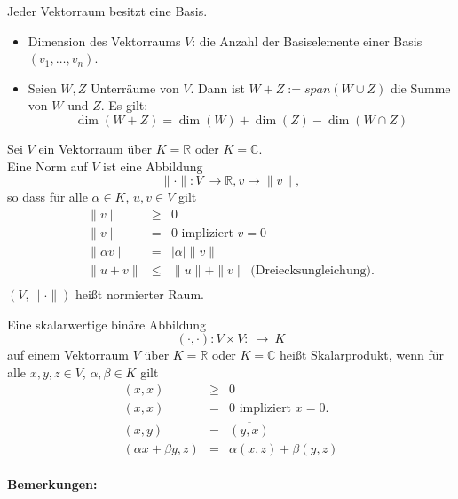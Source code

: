 \documentclass[a4paper,12pt,DIV15]{scrartcl}
\begin{document}
\begin{defn} Jeder Vektorraum besitzt eine Basis.
\begin{itemize}
\item {\color{red} Dimension} des Vektorraums $V$: die  Anzahl der Basiselemente einer Basis $(v_1,\dots, v_n)$.
\item Seien $W,Z$ Unterräume von $V$. Dann ist {\color{red} $W+Z:=span(W \cup Z)$}
die {\color{red} Summe} von $W$ und $Z$. Es gilt:
\[ \dim(W+Z)=\dim(W) + \dim (Z) - \dim( W \cap Z) \]
\end{itemize}
\end{defn}



\begin{defn}
Sei $V$ ein Vektorraum über $K=\mathbb{R}$ oder $K=\mathbb{C}$.\\
Eine {\color{red} Norm} auf $V$ ist eine Abbildung
\[ \| \cdot \|: V \ \rightarrow \mathbb{R}, v \mapsto \| v \|, \]
so dass für  alle $\alpha \in K$, $u,v \in V$ gilt 
\[ \begin{array} {rcl}
\| v \| & \geq & 0 \\
\| v \| & = & 0 \mbox{ impliziert } v=0\\
\| \alpha v \| & = & | \alpha | \| v \|\\
\| u + v \| & \leq & \| u \| + \| v \| \mbox{ (Dreiecksungleichung)}.\\
\end{array} \]
$(V,\| \cdot \|)$
heißt {\color{red} normierter Raum}.
\end{defn}

\begin{defn}[Skalarprodukt]
Eine skalarwertige binäre Abbildung
\[ ( \cdot, \cdot ): V \times V: \ \rightarrow \ K\]
auf einem Vektorraum $V$ über $K=\mathbb{R}$ oder $K=\mathbb{C}$ heißt
{\color{red} Skalarprodukt}, wenn für alle $x,y,z \in V$, $\alpha, \beta \in
K$ gilt 
\begin{eqnarray*}
(x,x) & \geq & 0\\
(x,x) & = & 0 \mbox{ impliziert } x=0.\\
(x,y) & = & \overline{(y,x)}\\
(\alpha x+\beta y,z) & = & \alpha (x,z)+ \beta (y,z)
\end{eqnarray*}
\end{defn}

\paragraph{Bemerkungen:}
\end{document}
